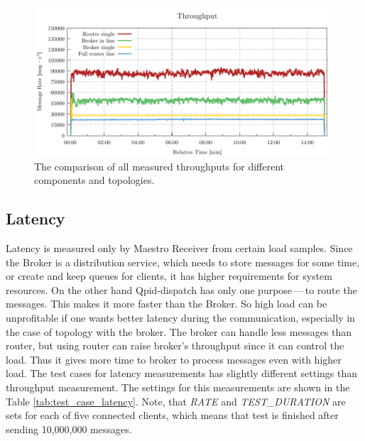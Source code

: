 \begin{figure}[H]
	\centering
	\includegraphics[width=1\linewidth]{obrazky-figures/charts/basic-throughput.pdf}
	\caption{The comparison of all measured throughputs for different components and topologies.}
	\label{fig:basic-throughput-comparison}
\end{figure}


\subsection{Latency}
\label{Latency}
Latency is measured only by Maestro Receiver from certain load samples. Since the Broker is a distribution service, which needs to store messages for some time, or create and keep queues for clients, it has higher requirements for system resources. On the other hand Qpid-dispatch has only one purpose\,---\,to route the messages. This makes it more faster than the Broker. So high load can be unprofitable if one wants better latency during the communication, especially in the case of topology with the broker. The broker can handle less messages than router, but using router can raise broker's throughput since it can control the load. Thus it gives more time to broker to process messages even with higher load. The test cases for latency measurements has slightly different settings than throughput measurement. The settings for this measurements are shown in the Table \ref{tab:test_case_latency}. Note, that \emph{RATE} and \emph{TEST\_DURATION} are sets for each of five connected clients, which means that test is finished after sending 10,000,000 messages.

